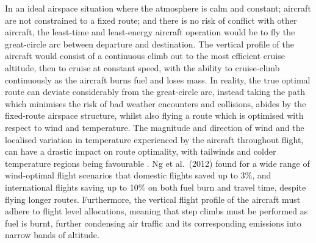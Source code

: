 In an ideal airspace situation where the atmosphere is calm and constant; aircraft are not constrained to a fixed route; and there is no risk of conflict with other aircraft, the least-time and least-energy aircraft operation would be to fly the great-circle arc between departure and destination. The vertical profile of the aircraft would consist of a continuous climb out to the most efficient cruise altitude, then to cruise at constant speed, with the ability to cruise-climb continuously as the aircraft burns fuel and loses mass. In reality, the true optimal route can deviate considerably from the great-circle arc, instead taking the path which minimises the risk of bad weather encounters and collisions, abides by the fixed-route airspace structure, whilst also flying a route which is optimised with respect to wind and temperature. The magnitude and direction of wind and the localised variation in temperature experienced by the aircraft throughout flight, can have a drastic impact on route optimality, with tailwinds and colder temperature regions being favourable \cite{Murrieta-Mendoza2014}. Ng et al.\ (2012) \cite{Ng2012} found for a wide range of wind-optimal flight scenarios that domestic flights saved up to 3\%, and international flights saving up to 10\% on both fuel burn and travel time, despite flying longer routes. Furthermore, the vertical flight profile of the aircraft must adhere to flight level allocations, meaning that step climbs must be performed as fuel is burnt, further condensing air traffic and its corresponding emissions into narrow bands of altitude. 

